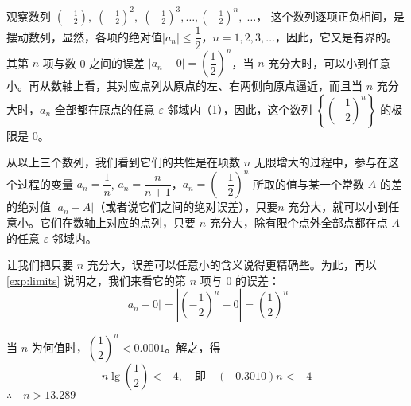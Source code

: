 \begin{example}\label{exp:limits}
  \linespread{1.65}\selectfont
  观察数列 $\displaystyle \left(-\frac{1}{2}\right),\; \left(-\frac{1}{2}\right)^2,\; \left(-\frac{1}{2}\right)^3,\ldots,\left(-\frac{1}{2}\right)^n,\;\ldots$， 这个数列逐项正负相间，是摆动数列，显然，各项的绝对值$|a_n|\leqslant\dfrac{1}{2}$，$n=1,2,3,\ldots$，因此，它又是有界的。其第 $n$ 项与数 0 之间的误差 $|a_n-0|=\left(\dfrac{1}{2}\right)^n$，当 $n$ 充分大时，可以小到任意小。再从数轴上看，其对应点列从原点的左、右两侧向原点逼近，而且当 $n$ 充分大时，$a_n$ 全部都在原点的任意 $\varepsilon$ 邻域内（\cref{fig:limits2}），因此，这个数列 $\left\{\left(-\dfrac{1}{2}\right)^n\right\}$ 的极限是 0。
\begin{figure}
    \caption{}\label{fig:limits2}
\end{figure}
\end{example}

从以上三个数列，我们看到它们的共性是在项数 $n$ 无限增大的过程中，参与在这个过程的变量 $a_n=\dfrac{1}{n}$, $a_n=\dfrac{n}{n+1}$，$a_n=\left(-\dfrac{1}{2}\right)^n$ 所取的值与某一个常数 $A$ 的差的绝对值 $|a_n-A|$（或者说它们之间的绝对误差），只要$n$ 充分大，就可以小到任意小。它们在数轴上对应的点列，只要 $n$ 充分大，除有限个点外全部点都在点 $A$ 的任意 $\varepsilon$ 邻域内。

让我们把只要 $n$ 充分大，误差可以任意小的含义说得更精确些。为此，再以\cref{exp:limits} 说明之，我们来看它的第 $n$ 项与 0 的误差：
\[|a_n-0|=\left|\left(-\frac{1}{2}\right)^n-0\right|=\left(\frac{1}{2}\right)^n\]

当 $n$ 为何值时，$\left(\dfrac{1}{2}\right)^n<0.0001$。解之，得
\[n\lg\left(\frac{1}{2}\right)<-4,\quad \text{即}\quad (-0.3010)n<-4\]
$\therefore\quad n>13.289$

